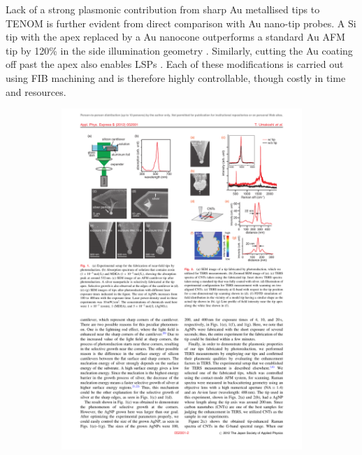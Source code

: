 \documentclass{article}
\begin{document}
Lack of a strong plasmonic contribution from sharp Au metallised tips to TENOM is further evident from direct comparison with Au nano-tip probes. A Si tip with the apex replaced by a Au nanocone outperforms a standard Au AFM tip by 120\% in the side illumination geometry \cite{huth2013}. Similarly, cutting the Au coating off past the apex also enables LSPs \cite{zou2009}. Each of these modifications is carried out using FIB machining and is therefore highly controllable, though costly in time and resources.

\begin{figure}[bt]
\centering
\begin{subfigure}[t]{0.35\textwidth}
	\includegraphics[width=\textwidth, clip=true, trim=0 0 0 130]{figures/literature/umakoshi2012a}

\end{subfigure}
\end{figure}
\end{document}
